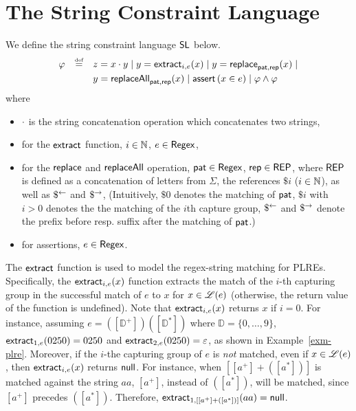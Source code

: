 
\section{The String Constraint Language}\label{sec:logic}

We define the string constraint language $\mathsf{SL}$ below.
\[
\begin{array}{l c l}
\smallskip
\varphi & \eqdef  & z = x \concat y \mid y  = \extract_{i, e}(x) \mid
y  = \replace_{\pat, \rep}(x) \mid \\
& & y = \replaceall_{\pat, \rep}(x)   \mid
 \ASSERT{x \in e} \mid \varphi \wedge \varphi\
\label{eq:SL}
\end{array}
\]
where
\begin{itemize}
	\item $\cdot$ is the string concatenation operation which concatenates two strings,
%
\item for the $\mathsf{extract}$ function, $i \in \mathbb{N}$, $e \in {\sf Regex}$,
%
	\item  for the $\mathsf{replace}$ and $\mathsf{replaceAll}$ operation, $\mathsf{pat}\in {\sf Regex}$, $\mathsf{rep} \in {\sf REP}$, where ${\sf REP}$ is defined as a concatenation of letters from $\Sigma$, the references $\$i$ ($i \in \mathbb{N}$), as well as $\$^{\leftarrow}$ and $\$^{\rightarrow}$, (Intuitively, $\$0$ denotes the matching of $\mathsf{pat}$, $\$i$ with $i > 0$ denotes the the matching of the $i$th capture group, $\$^{\leftarrow}$ and $\$^{\rightarrow}$ denote the prefix before resp. suffix after the matching of $\mathsf{pat}$.)
%
	\item for assertions, $e \in {\sf Regex}$.
\end{itemize}

The $\mathsf{extract}$ function is used to model the regex-string matching for PLREs.
Specifically, the $\mathsf{extract}_{i, e}(x)$ function extracts the match of the $i$-th capturing group in the successful match of $e$ to $x$ for $x \in \mathscr{L}(e)$ (otherwise, the return value of the function is undefined). Note that $\mathsf{extract}_{i, e}(x)$ returns $x$ if $i=0$. For instance, assuming $e = ([\mathbb{D}^+])([\mathbb{D}^*])$ where $\mathbb{D}=\{0,\ldots, 9\}$, $\mathsf{extract}_{1, e}(0250)=0250$ and $\mathsf{extract}_{2, e}(0250)=\varepsilon$, as shown in Example~\ref{exm-plre}. Moreover, if the $i$-the capturing group of $e$ is \emph{not} matched, even if $x \in \mathscr{L}(e)$, then $\mathsf{extract}_{i, e}(x)$ returns $\mathsf{null}$. For instance, when $[[a^+] + ([a^*])]$ is matched against the string $aa$, $[a^+]$, instead of $([a^*])$, will be matched, since $[a^+]$ precedes $([a^*])$. Therefore, $\mathsf{extract}_{1, [[a^+] + ([a^*])]}(aa) = \mathsf{null}$. 


